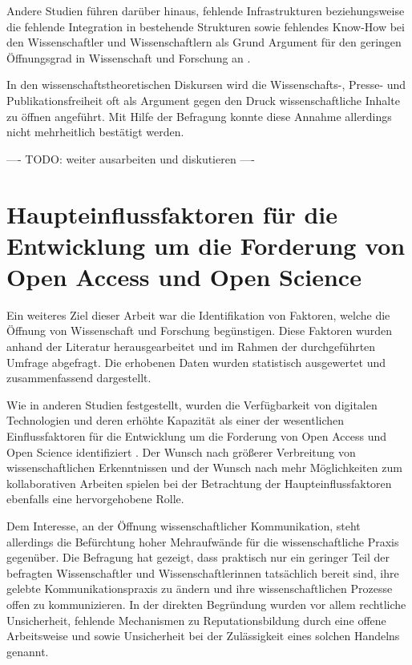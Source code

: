 Andere Studien führen darüber hinaus, fehlende Infrastrukturen beziehungsweise die fehlende Integration in bestehende Strukturen sowie fehlendes Know-How bei den Wissenschaftler und Wissenschaftlern als Grund Argument für den geringen Öffnungsgrad in Wissenschaft und Forschung an \cite{eu_open_science_2015}.

In den wissenschaftstheoretischen Diskursen wird die Wissenschafts-, Presse- und Publikationsfreiheit oft als Argument gegen den Druck wissenschaftliche Inhalte zu öffnen angeführt. Mit Hilfe der Befragung konnte diese Annahme allerdings nicht mehrheitlich bestätigt werden.

---- TODO: weiter ausarbeiten und diskutieren ----

\section{Haupteinflussfaktoren für die Entwicklung um die Forderung von Open Access und Open Science}

Ein weiteres Ziel dieser Arbeit war die Identifikation von Faktoren, welche die Öffnung von Wissenschaft und Forschung begünstigen. Diese Faktoren wurden anhand der Literatur herausgearbeitet und im Rahmen der durchgeführten Umfrage abgefragt. Die erhobenen Daten wurden statistisch ausgewertet und zusammenfassend dargestellt.

Wie in anderen Studien festgestellt, wurden die Verfügbarkeit von digitalen Technologien und deren erhöhte Kapazität als einer der wesentlichen Einflussfaktoren für die Entwicklung um die Forderung von Open Access und Open Science identifiziert \cite{eu_open_science_2015}. Der Wunsch nach größerer Verbreitung von wissenschaftlichen Erkenntnissen und der Wunsch nach mehr Möglichkeiten zum kollaborativen Arbeiten spielen bei der Betrachtung der Haupteinflussfaktoren ebenfalls eine hervorgehobene Rolle.

Dem Interesse, an der Öffnung wissenschaftlicher Kommunikation, steht allerdings die Befürchtung hoher Mehraufwände für die wissenschaftliche Praxis gegenüber. Die Befragung hat gezeigt, dass praktisch nur ein geringer Teil der befragten Wissenschaftler und Wissenschaftlerinnen tatsächlich bereit sind, ihre gelebte Kommunikationspraxis zu ändern und ihre wissenschaftlichen Prozesse offen zu kommunizieren. In der direkten Begründung wurden vor allem rechtliche Unsicherheit, fehlende Mechanismen zu Reputationsbildung durch eine offene Arbeitsweise und sowie Unsicherheit bei der Zulässigkeit eines solchen Handelns genannt.

